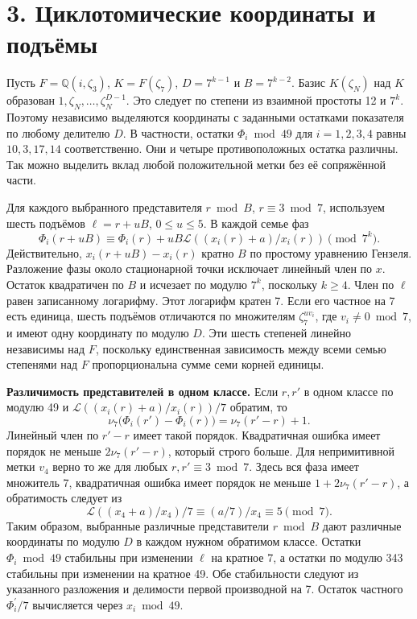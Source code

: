 \documentclass[11pt,a4paper]{article}
\newcommand{\sect}[1]{\section*{\sffamily\color{ink}#1}}
\newcommand{\subt}[1]{\par\medskip\noindent\textbf{#1.}\quad}
\newcommand{\QQ}{\mathbb Q}
\begin{document}
\newpage
\sect{3. Циклотомические координаты и подъёмы}
Пусть \(F=\QQ(i,\zeta_3)\), \(K=F(\zeta_7)\), \(D=7^{k-1}\) и \(B=7^{k-2}\). Базис \(K(\zeta_N)\) над \(K\) образован \(1,\zeta_N,\ldots,\zeta_N^{D-1}\). Это следует по степени из взаимной простоты 12 и \(7^k\). Поэтому независимо выделяются координаты с заданными остатками показателя по любому делителю \(D\). В частности, остатки \(\Phi_i\bmod49\) для \(i=1,2,3,4\) равны \(10,3,17,14\) соответственно. Они и четыре противоположных остатка различны. Так можно выделить вклад любой положительной метки без её сопряжённой части.

Для каждого выбранного представителя \(r\bmod B\), \(r\equiv3\bmod7\), используем шесть подъёмов \(\ell=r+uB\), \(0\le u\le5\). В каждой семье фаз
\[
  \Phi_i(r+uB)\equiv\Phi_i(r)
                  +uB\mathcal L((x_i(r)+a)/x_i(r))\pmod{7^k}.
\]
Действительно, \(x_i(r+uB)-x_i(r)\) кратно \(B\) по простому уравнению Гензеля. Разложение фазы около стационарной точки исключает линейный член по \(x\). Остаток квадратичен по \(B\) и исчезает по модулю \(7^k\), поскольку \(k\ge4\). Член по \(\ell\) равен записанному логарифму. Этот логарифм кратен 7. Если его частное на 7 есть единица, шесть подъёмов отличаются по множителям \(\zeta_7^{uv_i}\), где \(v_i\ne0\bmod7\), и имеют одну координату по модулю \(D\). Эти шесть степеней линейно независимы над \(F\), поскольку единственная зависимость между всеми семью степенями над \(F\) пропорциональна сумме семи корней единицы.

\subt{Различимость представителей в одном классе}
Если \(r,r'\) в одном классе по модулю 49 и \(\mathcal L((x_i(r)+a)/x_i(r))/7\) обратим, то
\[
              \nu_7\bigl(\Phi_i(r')-\Phi_i(r)\bigr)
                         =\nu_7(r'-r)+1 .
\]
Линейный член по \(r'-r\) имеет такой порядок. Квадратичная ошибка имеет порядок не меньше \(2\nu_7(r'-r)\), который строго больше. Для непримитивной метки \(v_4\) верно то же для любых \(r,r'\equiv3\bmod7\). Здесь вся фаза имеет множитель 7, квадратичная ошибка имеет порядок не меньше \(1+2\nu_7(r'-r)\), а обратимость следует из
\[
         \mathcal L((x_4+a)/x_4)/7\equiv(a/7)/x_4\equiv5\pmod7.
\]
Таким образом, выбранные различные представители \(r\bmod B\) дают различные координаты по модулю \(D\) в каждом нужном обратимом классе. Остатки \(\Phi_i\bmod49\) стабильны при изменении \(\ell\) на кратное 7, а остатки по модулю 343 стабильны при изменении на кратное 49. Обе стабильности следуют из указанного разложения и делимости первой производной на 7. Остаток частного \(\Phi_i^{\prime}/7\) вычисляется через \(x_i\bmod49\).
\end{document}

